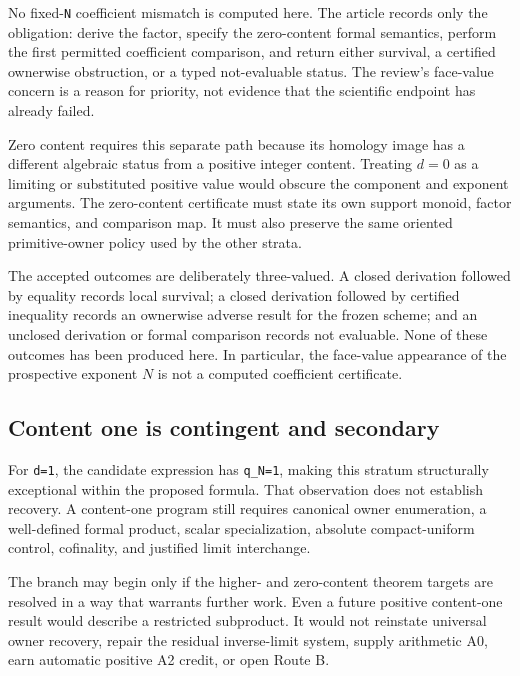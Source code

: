 \documentclass[11pt]{article}
\begin{document}
No fixed-\texttt{N} coefficient mismatch is computed here. The article
records only the obligation: derive the factor, specify the zero-content
formal semantics, perform the first permitted coefficient comparison,
and return either survival, a certified ownerwise obstruction, or a
typed not-evaluable status. The review's face-value concern is a reason
for priority, not evidence that the scientific endpoint has already
failed.

Zero content requires this separate path because its homology image has
a different algebraic status from a positive integer content. Treating
$d=0$ as a limiting or substituted positive value would obscure the
component and exponent arguments. The zero-content certificate must
state its own support monoid, factor semantics, and comparison map. It
must also preserve the same oriented primitive-owner policy used by the
other strata.

The accepted outcomes are deliberately three-valued. A closed
derivation followed by equality records local survival; a closed
derivation followed by certified inequality records an ownerwise
adverse result for the frozen scheme; and an unclosed derivation or
formal comparison records not evaluable. None of these outcomes has
been produced here. In particular, the face-value appearance of the
prospective exponent $N$ is not a computed coefficient certificate.

\hypertarget{44-content-one-is-contingent-and-secondary}{%
\subsection{Content one is contingent and
secondary}\label{44-content-one-is-contingent-and-secondary}}

For \texttt{d=1}, the candidate expression has \texttt{q\_N=1}, making
this stratum structurally exceptional within the proposed formula. That
observation does not establish recovery. A content-one program still
requires canonical owner enumeration, a well-defined formal product,
scalar specialization, absolute compact-uniform control, cofinality, and
justified limit interchange.

The branch may begin only if the higher- and zero-content theorem
targets are resolved in a way that warrants further work. Even a future
positive content-one result would describe a restricted subproduct. It
would not reinstate universal owner recovery, repair the residual
inverse-limit system, supply arithmetic A0, earn automatic positive A2
credit, or open Route B.
\end{document}
